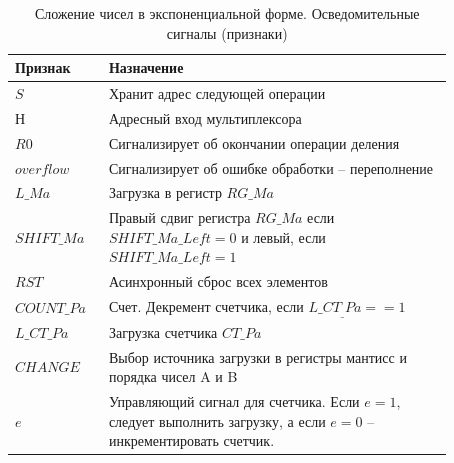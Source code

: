 \documentclass[a4paper,14pt]{extarticle}
\begin{document}
\begin{table}
	\centering
	\small
	\begin{tabular}{|m{0.17\linewidth}|m{0.7\linewidth}|}
		\hline
		\textbf{Признак} & \textbf{Назначение} \\ \hline
		$S$ & Хранит адрес следующей операции \\ \hline
		$Н$ & Адресный вход мультиплексора \\ \hline
		$R0$ & Сигнализирует об окончании операции деления \\ \hline
		$overflow$ & Сигнализирует об ошибке обработки -- переполнение \\ \hline
		$L\_Ma$ & Загрузка в регистр $RG\_Ma$ \\ \hline
		$SHIFT\_Ma$ & Правый сдвиг регистра $RG\_Ma$ если $SHIFT\_Ma\_Left=0$ и левый, если  $SHIFT\_Ma\_Left=1$ \\ \hline
		$RST$ & Асинхронный сброс всех элементов \\ \hline
		$COUNT\_Pa$ & Счет. Декремент счетчика, если $L\_CT_\_Pa==1$ \\ \hline
		$L\_CT\_Pa$ & Загрузка счетчика $CT\_Pa$ \\ \hline
		$CHANGE$ & Выбор источника загрузки в регистры мантисс и порядка чисел A и B \\ \hline
		$e$ & Управляющий сигнал для счетчика. Если $e=1$, следует выполнить загрузку, а если $e=0$ -- инкрементировать счетчик. \\ \hline
	\end{tabular}
	\caption{Сложение чисел в экспоненциальной форме. Осведомительные сигналы (признаки)}
	\label{tab:signalsop2}
\end{table}
\end{document}
